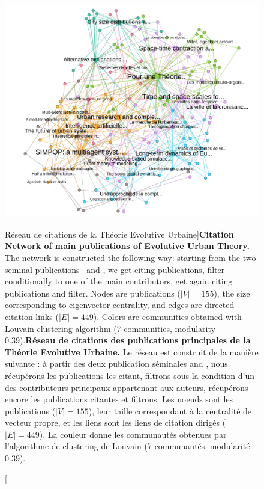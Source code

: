\begin{figure}[h!]
\hspace{-4cm}
\includegraphics[width=1.5\textwidth]{Figures/KnowledgeFramework/core}
\caption[Citation Network of main publications of Evolutive Urban Theory][Réseau de citations de la Théorie Evolutive Urbaine]{\textbf{Citation Network of main publications of Evolutive Urban Theory.} The network is constructed the following way: starting from the two seminal publications~\cite{pumain1997pour} and \cite{sanders1997simpop}, we get citing publications, filter conditionally to one of the main contributors, get again citing publications and filter. Nodes are publications ($\left|V\right|=155$), the size corresponding to eigenvector centrality, and edges are directed citation links ($\left|E\right|=449$). Colors are communities obtained with Louvain clustering algorithm (7 communities, modularity 0.39).}{\textbf{Réseau de citations des publications principales de la Théorie Evolutive Urbaine.} Le réseau est construit de la manière suivante : à partir des deux publication séminales \cite{pumain1997pour} and \cite{sanders1997simpop}, nous récupérons les publications les citant, filtrons sous la condition d'un des contributeurs principaux appartenant aux auteurs, récupérons encore les publications citantes et filtrons. Les noeuds sont les publications ($\left|V\right|=155$), leur taille correspondant à la centralité de vecteur propre, et les liens sont les liens de citation dirigés ($\left|E\right|=449$). La couleur donne les communautés obtenues par l'algorithme de clustering de Louvain (7 communautés, modularité 0.39).}
\label{fig:fig:knowledgeframework:citnw}
\end{figure}




